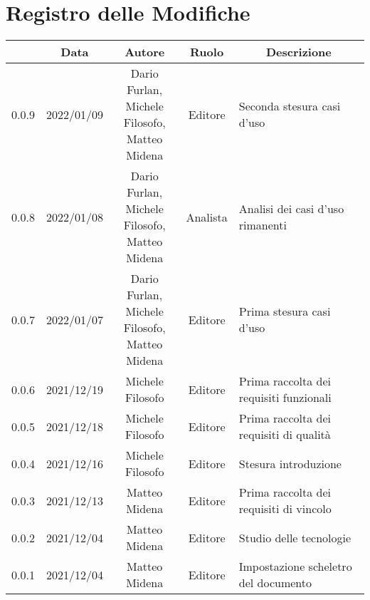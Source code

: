 \thispagestyle{empty}
\section*{Registro delle Modifiche}

\begin{center}
	\renewcommand{\arraystretch}{1.8}
	\begin{longtable}[c]{c | c | c | c | p{5cm}}
		\rowcolor[HTML]{125E28}
		\multicolumn{1}{c}{\color[HTML]{FFFFFF} \textbf{Versione}} & 
		\multicolumn{1}{c}{\color[HTML]{FFFFFF} \textbf{Data}} & 
		\multicolumn{1}{c}{\color[HTML]{FFFFFF} \textbf{Autore}} & 
		\multicolumn{1}{c}{\color[HTML]{FFFFFF} \textbf{Ruolo}} & 
		\multicolumn{1}{c}{\color[HTML]{FFFFFF} \textbf{Descrizione}} \\
		\endhead
		0.0.9 & 2022/01/09 & \shortstack{Dario Furlan,\\ Michele Filosofo,\\ Matteo Midena} & Editore & Seconda stesura casi d'uso \\
		0.0.8 & 2022/01/08 & \shortstack{Dario Furlan,\\ Michele Filosofo,\\ Matteo Midena} & Analista & Analisi dei casi d'uso rimanenti \\
		0.0.7 & 2022/01/07 & \shortstack{Dario Furlan,\\ Michele Filosofo,\\ Matteo Midena} & Editore & Prima stesura casi d'uso \\
		0.0.6 & 2021/12/19 & Michele Filosofo & Editore & Prima raccolta dei requisiti funzionali \\
		0.0.5 & 2021/12/18 & Michele Filosofo & Editore & Prima raccolta dei requisiti di qualità \\
		0.0.4 & 2021/12/16 & Michele Filosofo & Editore & Stesura introduzione \\
		0.0.3 & 2021/12/13 & Matteo Midena & Editore & Prima raccolta dei requisiti di vincolo\\
		0.0.2 & 2021/12/04 & Matteo Midena & Editore & Studio delle tecnologie\\
		0.0.1 & 2021/12/04 & Matteo Midena & Editore & Impostazione scheletro del documento\\
	\end{longtable}
\end{center}
